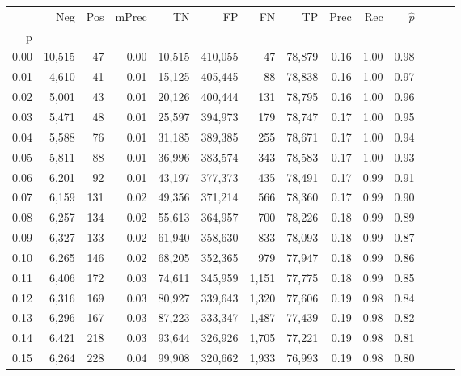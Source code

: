 \begin{tabular}{rrrrrrrrrrrrrr}
\toprule
{} &     Neg &    Pos & mPrec &       TN &       FP &      FN &      TP &  Prec &   Rec & $\hat{p}$ \\
p    &         &        &       &          &          &         &         &       &       &           \\
\midrule
0.00 &  10,515 &     47 &  0.00 &   10,515 &  410,055 &      47 &  78,879 &  0.16 &  1.00 &      0.98 \\
0.01 &   4,610 &     41 &  0.01 &   15,125 &  405,445 &      88 &  78,838 &  0.16 &  1.00 &      0.97 \\
0.02 &   5,001 &     43 &  0.01 &   20,126 &  400,444 &     131 &  78,795 &  0.16 &  1.00 &      0.96 \\
0.03 &   5,471 &     48 &  0.01 &   25,597 &  394,973 &     179 &  78,747 &  0.17 &  1.00 &      0.95 \\
0.04 &   5,588 &     76 &  0.01 &   31,185 &  389,385 &     255 &  78,671 &  0.17 &  1.00 &      0.94 \\
0.05 &   5,811 &     88 &  0.01 &   36,996 &  383,574 &     343 &  78,583 &  0.17 &  1.00 &      0.93 \\
0.06 &   6,201 &     92 &  0.01 &   43,197 &  377,373 &     435 &  78,491 &  0.17 &  0.99 &      0.91 \\
0.07 &   6,159 &    131 &  0.02 &   49,356 &  371,214 &     566 &  78,360 &  0.17 &  0.99 &      0.90 \\
0.08 &   6,257 &    134 &  0.02 &   55,613 &  364,957 &     700 &  78,226 &  0.18 &  0.99 &      0.89 \\
0.09 &   6,327 &    133 &  0.02 &   61,940 &  358,630 &     833 &  78,093 &  0.18 &  0.99 &      0.87 \\
0.10 &   6,265 &    146 &  0.02 &   68,205 &  352,365 &     979 &  77,947 &  0.18 &  0.99 &      0.86 \\
0.11 &   6,406 &    172 &  0.03 &   74,611 &  345,959 &   1,151 &  77,775 &  0.18 &  0.99 &      0.85 \\
0.12 &   6,316 &    169 &  0.03 &   80,927 &  339,643 &   1,320 &  77,606 &  0.19 &  0.98 &      0.84 \\
0.13 &   6,296 &    167 &  0.03 &   87,223 &  333,347 &   1,487 &  77,439 &  0.19 &  0.98 &      0.82 \\
0.14 &   6,421 &    218 &  0.03 &   93,644 &  326,926 &   1,705 &  77,221 &  0.19 &  0.98 &      0.81 \\
0.15 &   6,264 &    228 &  0.04 &   99,908 &  320,662 &   1,933 &  76,993 &  0.19 &  0.98 &      0.80 \\

\end{tabular}
